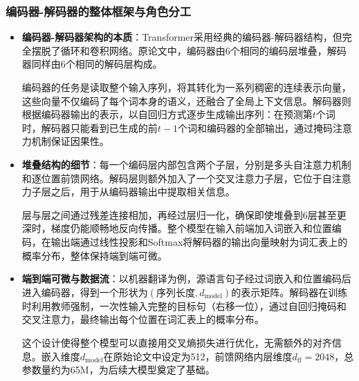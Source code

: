 \documentclass[11pt]{beamer}
\begin{document}
\begin{frame}
\frametitle{编码器-解码器的整体框架与角色分工}
\begin{itemize}
    \item \textbf{编码器-解码器架构的本质}：Transformer采用经典的编码器-解码器结构，但完全摆脱了循环和卷积网络。原论文中，\alert{编码器由6个相同的编码层堆叠}，解码器同样由6个相同的解码层构成。
    
    编码器的任务是读取整个输入序列，将其转化为一系列稠密的连续表示向量，这些向量不仅编码了每个词本身的语义，还融合了全局上下文信息。解码器则根据编码器输出的表示，以\alert{自回归}方式逐步生成输出序列：在预测第\(t\)个词时，解码器只能看到已生成的前\(t-1\)个词和编码器的全部输出，通过掩码注意力机制保证因果性。

    \item \textbf{堆叠结构的细节}：每一个编码层内部包含两个子层，分别是\alert{多头自注意力机制}和\alert{逐位置前馈网络}。解码层则额外加入了一个\alert{交叉注意力子层}，它位于自注意力子层之后，用于从编码器输出中提取相关信息。
    
    层与层之间通过\alert{残差连接}相加，再经过\alert{层归一化}，确保即使堆叠到6层甚至更深时，梯度仍能顺畅地反向传播。整个模型在输入前端加入词嵌入和位置编码，在输出端通过线性投影和Softmax将解码器的输出向量映射为词汇表上的概率分布，整体保持端到端可微。

    \item \textbf{端到端可微与数据流}：以机器翻译为例，源语言句子经过词嵌入和位置编码后进入编码器，得到一个形状为\((\text{序列长度}, d_{\text{model}})\)的表示矩阵。解码器在训练时利用\alert{教师强制}，一次性输入完整的目标句（右移一位），通过自回归掩码和交叉注意力，最终输出每个位置在词汇表上的概率分布。
    
    这个设计使得整个模型可以直接用交叉熵损失进行优化，无需额外的对齐信息。嵌入维度\(d_{\text{model}}\)在原始论文中设定为512，前馈网络内层维度\(d_{\text{ff}}=2048\)，总参数量约为65M，为后续大模型奠定了基础。
\end{itemize}
\end{frame}
\end{document}
